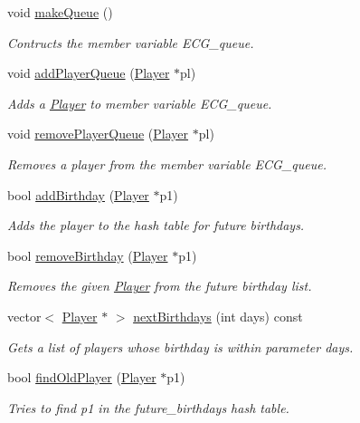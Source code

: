 \begin{DoxyCompactItemize}
void \hyperlink{class_club_a389972412da4a5b1cd62965ceefad7fe}{make\+Queue} ()
\begin{DoxyCompactList}\small\item\em Contructs the member variable E\+C\+G\+\_\+queue. \end{DoxyCompactList}\item 
void \hyperlink{class_club_aecaa2826d91ec8efdc8b8ecc5543f9d0}{add\+Player\+Queue} (\hyperlink{class_player}{Player} $\ast$pl)
\begin{DoxyCompactList}\small\item\em Adds a \hyperlink{class_player}{Player} to member variable E\+C\+G\+\_\+queue. \end{DoxyCompactList}\item 
void \hyperlink{class_club_ad09dd0ccccf5bd9dd465778ad127f41a}{remove\+Player\+Queue} (\hyperlink{class_player}{Player} $\ast$pl)
\begin{DoxyCompactList}\small\item\em Removes a player from the member variable E\+C\+G\+\_\+queue. \end{DoxyCompactList}\item 
bool \hyperlink{class_club_a085dd799d98de3efc6e43d81718f54a3}{add\+Birthday} (\hyperlink{class_player}{Player} $\ast$p1)
\begin{DoxyCompactList}\small\item\em Adds the player to the hash table for future birthdays. \end{DoxyCompactList}\item 
bool \hyperlink{class_club_afccacb082df30292238e2da709c9c044}{remove\+Birthday} (\hyperlink{class_player}{Player} $\ast$p1)
\begin{DoxyCompactList}\small\item\em Removes the given \hyperlink{class_player}{Player} from the future birthday list. \end{DoxyCompactList}\item 
vector$<$ \hyperlink{class_player}{Player} $\ast$ $>$ \hyperlink{class_club_a63871ced4b025d0a3ab488c9a47a4d07}{next\+Birthdays} (int days) const
\begin{DoxyCompactList}\small\item\em Gets a list of players whose birthday is within parameter days. \end{DoxyCompactList}\item 
bool \hyperlink{class_club_aefc39e233faadeb0463e959628ab4a0d}{find\+Old\+Player} (\hyperlink{class_player}{Player} $\ast$p1)
\begin{DoxyCompactList}\small\item\em Tries to find p1 in the future\+\_\+birthdays hash table. \end{DoxyCompactList}\item 

\end{DoxyCompactItemize}
